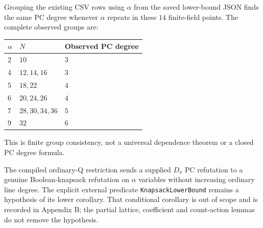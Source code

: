 Grouping the existing CSV rows using $\alpha$ from the saved lower-bound
JSON finds the same PC degree whenever $\alpha$ repeats in these $14$
finite-field points. The complete observed groups are:
\begin{center}
\begin{tabular}{@{}lll@{}}
\toprule
$\alpha$ & $N$ & Observed PC degree\\
\midrule
$2$ & $10$ & $3$ \\
$4$ & $12,14,16$ & $3$ \\
$5$ & $18,22$ & $4$ \\
$6$ & $20,24,26$ & $4$ \\
$7$ & $28,30,34,36$ & $5$ \\
$9$ & $32$ & $6$ \\
\bottomrule
\end{tabular}
\end{center}
This is finite group consistency, not a universal dependence theorem or a
closed PC degree formula.

The compiled ordinary-Q restriction sends a supplied $D_\pi$ PC refutation
to a genuine Boolean-knapsack refutation on $\alpha$ variables without
increasing ordinary line degree. The explicit external predicate
\texttt{KnapsackLowerBound} remains a hypothesis of its lower corollary.
That conditional corollary is out of scope and is recorded in Appendix B;
the partial lattice, coefficient and count-action lemmas do not remove
the hypothesis.
